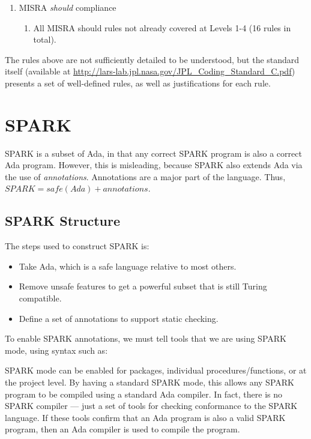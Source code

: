\begin{example}
\begin{enumerate}
 \item MISRA \emph{should} compliance 
 \begin{enumerate}
  \item All MISRA should rules not already covered at Levels 1-4 (16 rules in total).
 \end{enumerate}
\end{enumerate}

The rules above are not sufficiently detailed to be understood, but the standard itself \cite{jpl-nasa-coding-standard09} (available at \url{http://lars-lab.jpl.nasa.gov/JPL_Coding_Standard_C.pdf}) presents a set of well-defined rules, as well as justifications for each rule.

\end{example}

\section{SPARK}

SPARK is a subset of Ada, in that any correct SPARK program is also a correct Ada program. However, this is misleading, because SPARK also extends Ada via the use of \emph{annotations}. Annotations are a major part of the language. Thus, $SPARK = safe(Ada) + annotations$.

\subsection{SPARK Structure}

The steps used to construct SPARK is:

\begin{itemize}

 \item Take Ada, which is a safe language relative to most others.

 \item Remove unsafe features to get a powerful subset that is still Turing compatible.

 \item Define a set of annotations to support static checking.

\end{itemize}

To enable SPARK annotations, we must tell tools that we are using SPARK mode, using syntax such as:



SPARK mode can be enabled for packages, individual procedures/functions, or at the project level. By having a standard SPARK mode, this allows any SPARK program to be compiled using a standard Ada compiler. In fact, there is no SPARK compiler --- just a set of tools for checking conformance to the SPARK language. If these tools confirm that an Ada program is also a valid SPARK program, then an Ada compiler is used to compile the program.

